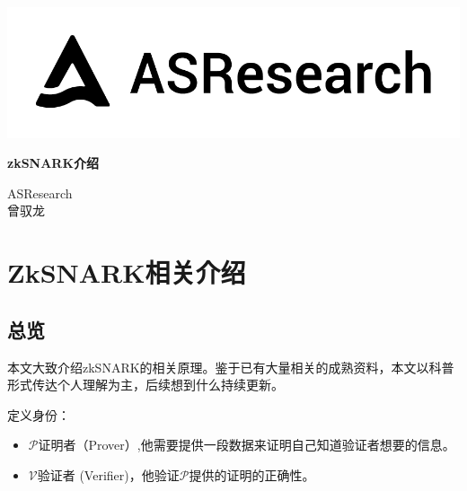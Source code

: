 \documentclass[12pt]{article}
\newcommand{\zk}{zkSNARK}
\newcommand{\pp}{$\mathcal{P}$}
\newcommand{\vv}{$\mathcal{V}$}
\begin{document}
\pagestyle{empty}
\renewcommand{\contentsname}{目录}
\renewcommand{\abstractname}{摘要}
\renewcommand{\refname}{参考文献}
\renewcommand{\figurename}{图}
\renewcommand{\tablename}{表}
\renewcommand{\baselinestretch}{1.5}
\renewcommand{\appendixname}{附录}
\renewcommand{\proofname}{证明}

\pagecolor{\pcolor}



\begin{titlepage}
  \begin{center}
    \vspace*{5.5cm}
    \includegraphics[scale=0.5]{../common/logo.png}
    \vspace{0.5cm}


   \textbf{\huge{\zk 介绍}}

    \vspace{0.5cm}
    ASResearch\\曾驭龙
    \textbf{}
  \end{center}

\end{titlepage}
\setcounter{page}{0}
\tableofcontents
\newpage
\setcounter{page}{1}
\pagestyle{fancy}
\vspace*{0.01cm}

\section{ZkSNARK相关介绍}
\subsection{总览}
本文大致介绍zkSNARK的相关原理。鉴于已有大量相关的成熟资料，本文以科普形式传达个人理解为主，后续想到什么持续更新。

定义身份：
\begin{itemize}
\item \pp 证明者（Prover）,他需要提供一段数据来证明自己知道验证者想要的信息。
\item \vv 验证者 (Verifier)，他验证\pp 提供的证明的正确性。
\end{itemize}
\end{document}
